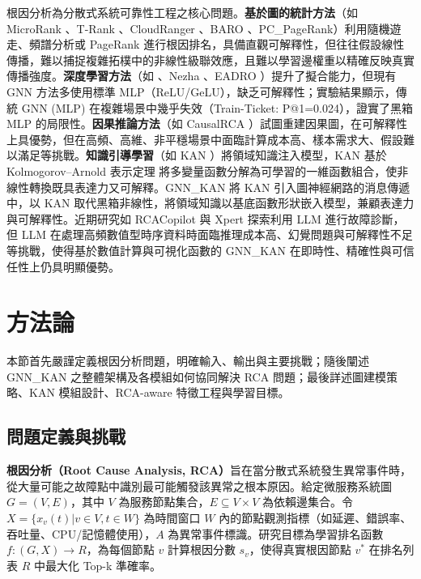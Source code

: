 \documentclass[10pt,a4paper,twocolumn]{article}
\begin{document}
根因分析為分散式系統可靠性工程之核心問題。\textbf{基於圖的統計方法}（如 MicroRank \cite{microrank2021}、T-Rank \cite{trank2021}、CloudRanger \cite{cloudranger2018}、BARO \cite{baro2023}、PC\_PageRank）利用隨機遊走、頻譜分析或 PageRank 進行根因排名，具備直觀可解釋性，但往往假設線性傳播，難以捕捉複雜拓樸中的非線性級聯效應，且難以學習邊權重以精確反映真實傳播強度。\textbf{深度學習方法}（如 \cite{gnn_rca2023}、Nezha \cite{nezha2023}、EADRO \cite{eadro2023}）提升了擬合能力，但現有 GNN 方法多使用標準 MLP（ReLU/GeLU），缺乏可解釋性；實驗結果顯示，傳統 GNN (MLP) 在複雜場景中幾乎失效（Train-Ticket: P@1=0.024），證實了黑箱 MLP 的局限性。\textbf{因果推論方法}（如 CausalRCA \cite{causalrca2023}）試圖重建因果圖，在可解釋性上具優勢，但在高頻、高維、非平穩場景中面臨計算成本高、樣本需求大、假設難以滿足等挑戰。\textbf{知識引導學習}（如 KAN \cite{kan2024}）將領域知識注入模型，KAN 基於 Kolmogorov–Arnold 表示定理 \cite{kolmogorov1957} 將多變量函數分解為可學習的一維函數組合，使非線性轉換既具表達力又可解釋。GNN\_KAN 將 KAN 引入圖神經網路的消息傳遞中，以 KAN 取代黑箱非線性，將領域知識以基底函數形狀嵌入模型，兼顧表達力與可解釋性。近期研究如 RCACopilot \cite{rcacopilot2024} 與 Xpert \cite{xpert2024} 探索利用 LLM 進行故障診斷，但 LLM 在處理高頻數值型時序資料時面臨推理成本高、幻覺問題與可解釋性不足等挑戰，使得基於數值計算與可視化函數的 GNN\_KAN 在即時性、精確性與可信任性上仍具明顯優勢。

\section{方法論}

本節首先嚴謹定義根因分析問題，明確輸入、輸出與主要挑戰；隨後闡述 GNN\_KAN 之整體架構及各模組如何協同解決 RCA 問題；最後詳述圖建模策略、KAN 模組設計、RCA-aware 特徵工程與學習目標。

\subsection{問題定義與挑戰}

\textbf{根因分析（Root Cause Analysis, RCA）}旨在當分散式系統發生異常事件時，從大量可能之故障點中識別最可能觸發該異常之根本原因。給定微服務系統圖 $G=(V, E)$，其中 $V$ 為服務節點集合，$E \subseteq V \times V$ 為依賴邊集合。令 $X = \{x_v(t) | v \in V, t \in W\}$ 為時間窗口 $W$ 內的節點觀測指標（如延遲、錯誤率、吞吐量、CPU/記憶體使用），$A$ 為異常事件標識。研究目標為學習排名函數 $f: (G, X) \to R$，為每個節點 $v$ 計算根因分數 $s_v$，使得真實根因節點 $v^*$ 在排名列表 $R$ 中最大化 Top-k 準確率。
\end{document}
